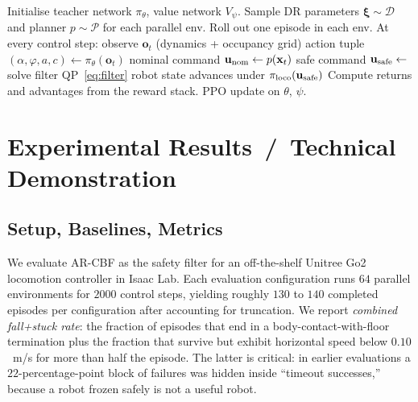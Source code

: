 \documentclass{article}
\newcommand{\bx}{\mathbf{x}}
\newcommand{\bu}{\mathbf{u}}
\newcommand{\bo}{\mathbf{o}}
\newcommand{\methodname}{\textsc{AR-CBF}}  %
\begin{document}
\begin{algorithm}[H]
\caption{\methodname{} Training (Teacher)}
\label{alg:train}
\begin{algorithmic}[1]
\State Initialise teacher network $\pi_\theta$, value network $V_\psi$.
  \State Sample DR parameters $\boldsymbol\xi\sim\mathcal{D}$ and planner $p\sim\mathcal{P}$ for each parallel env.
  \State Roll out one episode in each env. At every control step:
  \State \quad observe $\bo_t$ (dynamics + occupancy grid)
  \State \quad action tuple $(\alpha,\varphi,a,c) \gets \pi_\theta(\bo_t)$
  \State \quad nominal command $\bu_\textup{nom}\gets p(\bx_t)$
  \State \quad safe command $\bu_\textup{safe}\gets$ solve filter QP~\eqref{eq:filter}
  \State \quad robot state advances under $\pi_\text{loco}(\bu_\textup{safe})$
  \State Compute returns and advantages from the reward stack.
  \State PPO update on $\theta$, $\psi$.
\EndFor
\State {}
\end{algorithmic}
\end{algorithm}

\section{Experimental Results \,/\, Technical Demonstration}
\label{sec:results}

\subsection{Setup, Baselines, Metrics}

We evaluate \methodname{} as the safety filter for an off-the-shelf Unitree Go2
locomotion controller in Isaac Lab. Each evaluation configuration runs
$64$ parallel environments for $2000$ control steps, yielding roughly
$130$ to $140$ completed episodes per configuration after accounting for
truncation. We report \emph{combined fall+stuck rate}: the fraction of
episodes that end in a body-contact-with-floor termination plus the fraction
that survive but exhibit horizontal speed below $0.10$~m/s for more than half
the episode. The latter is critical: in earlier evaluations a
$22$-percentage-point block of failures was hidden inside ``timeout
successes,'' because a robot frozen safely is not a useful robot.
\end{document}
